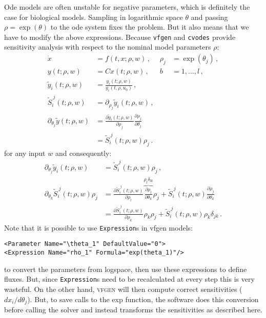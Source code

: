 \documentclass[utf8,english]{scrartcl}
\begin{document}
Ode models are often unstable for negative parameters, which is
definitely the case for biological models.  Sampling in logarithmic
space $\theta$ and passing $\rho=\exp(\theta)$ to the ode system fixes
the problem. But it also means that we have to modify the above
expressions. Because \texttt{vfgen} and \texttt{cvodes} provide
sensitivity analysis with respect to the nominal model parameters
$\rho$:
\begin{align}
  \dot x&=f(t,x;\rho,w)\,,& \rho_j&=\exp(\theta_j)\,,\nonumber\\
  y(t;\rho,w)&=C x(t;\rho,w)\,,& b&=1,\dots,l\,,\nonumber\\
  \tilde y_i(t;\rho,w)&=\frac{y_i(t;\rho,w)}{y_i(t,\rho,u_0)}\,,\label{eq:ode_rho}\\
  \tilde S_i^{~j}(t;\rho,w)&=\partial_{\rho_j} \tilde y_i(t;\rho,w)\,,\nonumber\\
  \partial_{\theta_j}\tilde y(t;\rho,w)&=\frac{\partial\tilde y_i(t;\rho,w)}{\partial\rho_j}\frac{\partial \rho_j}{\partial\theta_j}\nonumber\\
  &=\tilde S_i^{~j}(t;\rho,w)\rho_j\,.\nonumber
\end{align}
for any input $w$ and consequently:
\begin{align}
  \partial_{\theta_j}\tilde y_i(t;\rho,w)&=\tilde S_i^{~j}(t;\rho,w)\rho_j\,,\nonumber\\
  \partial_{\theta_k}\tilde S_i^{~j}(t;\rho,w)\rho_j&=\frac{\partial
    \tilde
    S_i^{~j}(t;\rho,w)}{\partial\rho_l}\overbrace{\frac{\partial\rho_l}{\partial\theta_k}}^{\rho_l\delta_{lk}}\rho_j
  + \tilde
  S_i^{~j}(t;\rho,w)\frac{\partial\rho_j}{\partial\theta_k}\label{eq:dfyS_rho}\\
  &=\frac{\partial \tilde
    S_i^{~j}(t;\rho,w)}{\partial\rho_k}\rho_k\rho_j + \tilde
  S_i^{~j}(t;\rho,w)\rho_k\delta_{jk}\,.\nonumber
\end{align}
Note that it is possible to use \texttt{Expression}s in vfgen models:
\begin{center}
\begin{verbatim}
<Parameter Name="\theta_1" DefaultValue="0">
<Expression Name="rho_1" Formula="exp(theta_1)"/>
\end{verbatim}
\end{center}
to convert the parameters from logspace, then use these expressions to
define fluxes. But, since \texttt{Expression}s need to be recalculated
at every step this is very wasteful. On the other hand, \textsc{vfgen}
will then compute correct sensitivities ($dx_i/d\theta_j$). But, to
save calls to the exp function, the software does this conversion
before calling the solver and instead transforms the sensitivities as
described here.
\end{document}
